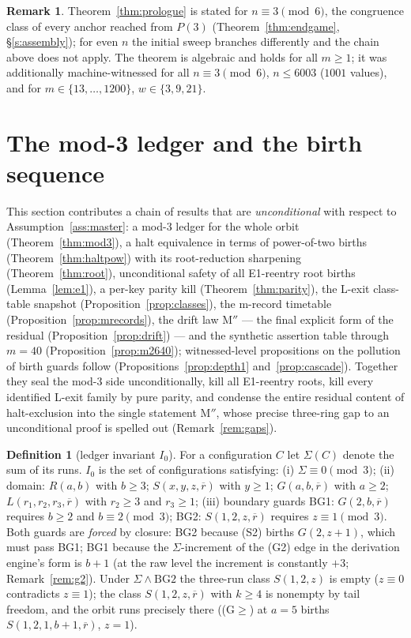 \documentclass[11pt]{amsart}
\theoremstyle{definition}
\newtheorem{definition}[theorem]{Definition}
\newtheorem{remark}[theorem]{Remark}
\begin{document}
\begin{remark}
Theorem~\ref{thm:prologue} is stated for $n\equiv3\pmod6$, the congruence
class of every anchor reached from $P(3)$ (Theorem~\ref{thm:endgame},
\S\ref{s:assembly}); for even $n$ the initial sweep branches differently
and the chain above does not apply. The theorem is algebraic and holds for
all $m\ge1$; it was additionally machine-witnessed for all
$n\equiv3\pmod6$, $n\le6003$ ($1001$ values), and for
$m\in\{13,\dots,1200\}$, $w\in\{3,9,21\}$.
\end{remark}

\section{The mod-3 ledger and the birth sequence}\label{s:ledger}

This section contributes a chain of results that are \emph{unconditional} with respect to
Assumption~\ref{ass:master}: a mod-3 ledger for the whole orbit
(Theorem~\ref{thm:mod3}), a halt equivalence in terms of power-of-two births
(Theorem~\ref{thm:haltpow}) with its root-reduction sharpening
(Theorem~\ref{thm:root}), unconditional safety of all E1-reentry root births
(Lemma~\ref{lem:e1}), a per-key parity kill (Theorem~\ref{thm:parity}), the
L-exit class-table snapshot (Proposition~\ref{prop:classes}), the m-record
timetable (Proposition~\ref{prop:mrecords}), the drift law $\mathrm{M''}$ ---
the final explicit form of the residual (Proposition~\ref{prop:drift}) --- and
the synthetic assertion table through $m=40$
(Proposition~\ref{prop:m2640}); witnessed-level propositions on
the pollution of birth guards follow
(Propositions~\ref{prop:depth1} and~\ref{prop:cascade}). Together they seal the
mod-3 side unconditionally, kill all E1-reentry roots, kill every identified
L-exit family by pure parity, and condense the entire residual content of
halt-exclusion into the single statement $\mathrm{M''}$, whose precise
three-ring gap to an unconditional proof is spelled out
(Remark~\ref{rem:gaps}).

\begin{definition}[ledger invariant $I_0$]\label{def:I0}
For a configuration $C$ let $\Sigma(C)$ denote the sum of its runs. $I_0$ is
the set of configurations satisfying: (i) $\Sigma\equiv0\pmod3$; (ii) domain:
$R(a,b)$ with $b\ge3$; $S(x,y,z,\overline r)$ with $y\ge1$; $G(a,b,\overline
r)$ with $a\ge2$; $L(r_1,r_2,r_3,\overline r)$ with $r_2\ge3$ and $r_3\ge1$;
(iii) boundary guards BG1: $G(2,b,\overline r)$ requires $b\ge2$ and
$b\equiv2\pmod3$; BG2: $S(1,2,z,\overline r)$ requires $z\equiv1\pmod3$.
Both guards are \emph{forced} by closure: BG2 because (S2) births
$G(2,z{+}1)$, which must pass BG1; BG1 because the $\Sigma$-increment of the
(G2) edge in the derivation engine's form is $b+1$ (at the raw level the
increment is constantly $+3$; Remark~\ref{rem:g2}). Under
$\Sigma\wedge\mathrm{BG2}$ the three-run class $S(1,2,z)$ is empty
($z\equiv0$ contradicts $z\equiv1$); the class $S(1,2,z,\overline r)$ with
$k\ge4$ is nonempty by tail freedom, and the orbit runs precisely there
((G$\ge$) at $a=5$ births $S(1,2,1,b{+}1,\overline r)$, $z=1$).
\end{definition}
\end{document}
